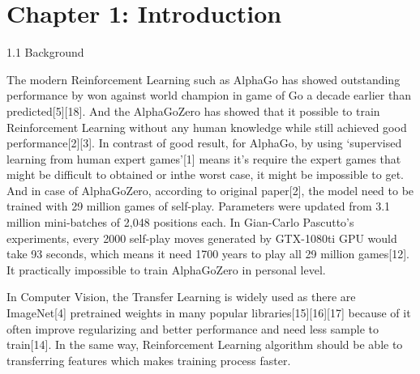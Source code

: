 \documentclass[12pt,a4paper]{article}
\begin{document}
\section*{Chapter 1: Introduction}
{\large 1.1 Background \par\vspace{0.1cm}}
{
The modern Reinforcement Learning such as AlphaGo has showed outstanding performance by won against world champion in game of Go a decade earlier than predicted[5][18]. And the AlphaGoZero has showed that it possible to train Reinforcement Learning without any human knowledge while still achieved good performance[2][3]. In contrast of good result, for AlphaGo, by using ‘supervised learning from human expert games’[1] means it's require the expert games that might be difficult to obtained or inthe worst case, it might be impossible to get. And in case of AlphaGoZero, according to original paper[2], the model need to be trained with 29 million games of self-play. Parameters were updated from 3.1 million mini-batches of 2,048 positions each. In Gian-Carlo Pascutto's experiments, every 2000 self-play moves generated by GTX-1080ti GPU would take 93 seconds, which means it need 1700 years to play all 29 million games[12]. It practically impossible to train AlphaGoZero in personal level.\par
}
{
In Computer Vision, the Transfer Learning is widely used as there are ImageNet[4] pretrained weights in many popular libraries[15][16][17]  because of it often improve regularizing and better performance and need less sample to train[14]. In the same way, Reinforcement Learning algorithm should be able to transferring features which makes training process faster.
}
\clearpage


\end{document}
